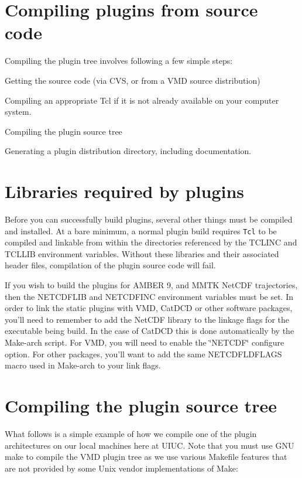 \section{Compiling plugins from source code}\label{compiling}


 Compiling the plugin tree involves following a few simple steps: \begin{CompactItemize}
\item 
Getting the source code (via CVS, or from a VMD source distribution) \item 
Compiling an appropriate Tcl if it is not already available on your computer system. \item 
Compiling the plugin source tree  \item 
Generating a plugin distribution directory, including documentation. \end{CompactItemize}
\section{Libraries required by plugins}\label{pluginfiles}
 

 Before you can successfully build plugins, several other things must be compiled and installed. At a bare minimum, a normal plugin build requires {\tt Tcl} to be compiled  and linkable from within the directories referenced by the  TCLINC and TCLLIB environment variables. Without these libraries and their associated header files,  compilation of the plugin source code will fail.



 If you wish to build the plugins for AMBER 9, and MMTK Net\-CDF trajectories, then the NETCDFLIB and NETCDFINC environment variables must be set. In order to link the static plugins with VMD, Cat\-DCD or other software packages, you'll need to remember to add the Net\-CDF library to the linkage flags for the executable being build. In the case of Cat\-DCD this is done automatically by the Make-arch script. For VMD, you will need to enable the \char`\"{}NETCDF\char`\"{} configure option. For other packages, you'll want to add the same NETCDFLDFLAGS macro used in Make-arch to your link flags.

\section{Compiling the plugin source tree}\label{compilefromsrc}
 

 What follows is a simple example of how we compile one of the plugin architectures on our local machines here at UIUC.  Note that you must use GNU make to compile the VMD plugin tree as we use various Makefile features that are not provided by some Unix vendor implementations of Make:

